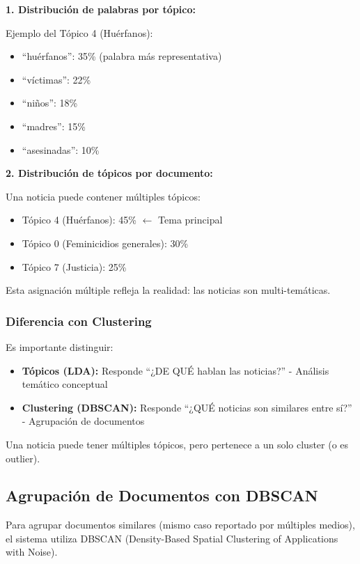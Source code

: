 \textbf{1. Distribución de palabras por tópico:}

Ejemplo del Tópico 4 (Huérfanos):
\begin{itemize}
    \item ``huérfanos'': 35\% (palabra más representativa)
    \item ``víctimas'': 22\%
    \item ``niños'': 18\%
    \item ``madres'': 15\%
    \item ``asesinadas'': 10\%
\end{itemize}

\textbf{2. Distribución de tópicos por documento:}

Una noticia puede contener múltiples tópicos:
\begin{itemize}
    \item Tópico 4 (Huérfanos): 45\% $\leftarrow$ Tema principal
    \item Tópico 0 (Feminicidios generales): 30\%
    \item Tópico 7 (Justicia): 25\%
\end{itemize}

Esta asignación múltiple refleja la realidad: las noticias son multi-temáticas.

\subsubsection{Diferencia con Clustering}
\label{subsubsec:topicos_vs_clustering}

Es importante distinguir:
\begin{itemize}
    \item \textbf{Tópicos (LDA):} Responde ``¿DE QUÉ hablan las noticias?'' - Análisis temático conceptual
    \item \textbf{Clustering (DBSCAN):} Responde ``¿QUÉ noticias son similares entre sí?'' - Agrupación de documentos
\end{itemize}

Una noticia puede tener múltiples tópicos, pero pertenece a un solo cluster (o es outlier).

\subsection{Agrupación de Documentos con DBSCAN}
\label{subsec:dbscan}

Para agrupar documentos similares (mismo caso reportado por múltiples medios), el sistema utiliza DBSCAN (Density-Based Spatial Clustering of Applications with Noise).

